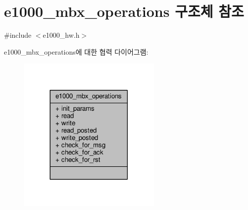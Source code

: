 \hypertarget{structe1000__mbx__operations}{}\section{e1000\+\_\+mbx\+\_\+operations 구조체 참조}
\label{structe1000__mbx__operations}


{\ttfamily \#include $<$e1000\+\_\+hw.\+h$>$}



e1000\+\_\+mbx\+\_\+operations에 대한 협력 다이어그램\+:
\nopagebreak
\begin{figure}[H]
\begin{center}
\leavevmode
\includegraphics[width=197pt]{structe1000__mbx__operations__coll__graph}
\end{center}
\end{figure}
